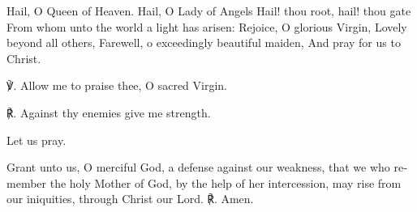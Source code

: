 \begin{otherlanguage}{english}Hail, O Queen of Heaven.
Hail, O Lady of Angels
Hail! thou root, hail! thou gate
From whom unto the world a light has arisen:
Rejoice, O glorious Virgin,
Lovely beyond all others,
Farewell, o exceedingly beautiful maiden,
And pray for us to Christ.

℣. Allow me to praise thee, O sacred Virgin.

℟. Against thy enemies give me strength.

Let us pray.

Grant unto us, O merciful God, a defense against our weakness, that we who remember the holy Mother of God, by the help of her intercession, may rise from our iniquities, through Christ our Lord. ℟. Amen.
\end{otherlanguage}